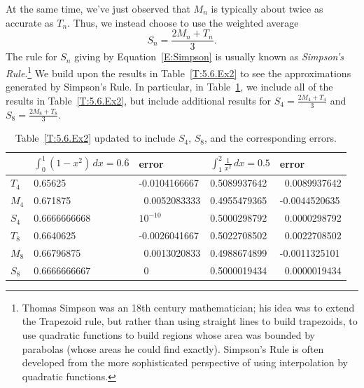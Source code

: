 At the same time, we've just observed that $M_n$ is typically about twice as accurate as $T_n$.  Thus, we instead choose to use the weighted average 
\begin{equation} \label{E:Simpson}
S_n = \frac{2M_n + T_n}{3}.
\end{equation}
The rule for $S_n$ giving by Equation~\ref{E:Simpson} is usually known as \emph{Simpson's Rule}.\footnote{Thomas Simpson was an 18th century mathematician; his idea was to extend the Trapezoid rule, but rather than using straight lines to build trapezoids, to use quadratic functions to build regions whose area was bounded by parabolas (whose areas he could find exactly).  Simpson's Rule is often developed from the more sophisticated perspective of using interpolation by quadratic functions.}  We build upon the results in Table~\ref{T:5.6.Ex2} to see the approximations generated by Simpson's Rule.  In particular, in Table~\ref{T:5.6.Ex3}, we include all of the results in Table~\ref{T:5.6.Ex2}, but include additional results for $S_4 = \frac{2M_4 + T_4}{3}$ and $S_8 = \frac{2M_8 + T_8}{3}$.
\begingroup
\small
\begin{table}[h]
\begin{center}
\begin{tabular}{ | l | l | l || l | l | }
   \hline 
   \T \ & $\int_0^1 (1-x^2) \,dx = 0.\overline{6} $ &  error  & $\int_1^2 \frac{1}{x^2} \, dx = 0.5$ & error   \B \\
   \hline \hline
   \T $T_4$ & 0.65625 & -0.0104166667 & 0.5089937642 & \ 0.0089937642 \B \\
   \hline
   \T $M_4$ & 0.671875 & \ 0.0052083333 & 0.4955479365 & -0.0044520635 \B \\
   \hline
   \T $S_4$ & 0.6666666668 & $10^{-10}$ \  & 0.5000298792 & \ 0.0000298792 \B \\
   \hline
   \T $T_8$ & 0.6640625 & -0.0026041667 & 0.5022708502 & \ 0.0022708502 \B \\
   \hline
   \T $M_8$ & 0.66796875 & \ 0.0013020833 & 0.4988674899 & -0.0011325101 \B \\
   \hline
   \T $S_8$ & 0.6666666667 & \ 0 & 0.5000019434 & \ 0.0000019434 \B \\
   \hline
   \end{tabular} 
\end{center}
\caption{Table~\ref{T:5.6.Ex2} updated to include $S_4$, $S_8$, and the corresponding errors.} \label{T:5.6.Ex3}
\end{table}
\endgroup

